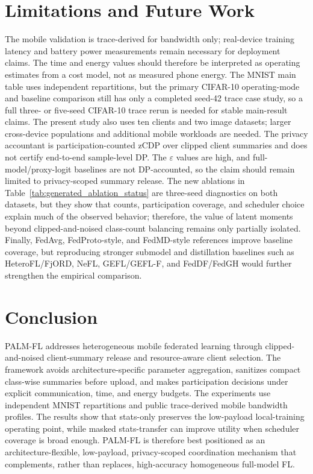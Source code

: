 \documentclass[10pt,journal]{IEEEtran}
\newcommand{\statsonly}{stats-only}
\newcommand{\statstransfer}{stats-transfer}
\begin{document}
\section{Limitations and Future Work}
The mobile validation is trace-derived for bandwidth only; real-device training latency and battery power measurements remain necessary for deployment claims. The time and energy values should therefore be interpreted as operating estimates from a cost model, not as measured phone energy. The MNIST main table uses independent repartitions, but the primary CIFAR-10 operating-mode and baseline comparison still has only a completed seed-42 trace case study, so a full three- or five-seed CIFAR-10 trace rerun is needed for stable main-result claims. The present study also uses ten clients and two image datasets; larger cross-device populations and additional mobile workloads are needed. The privacy accountant is participation-counted zCDP over clipped client summaries and does not certify end-to-end sample-level DP. The $\varepsilon$ values are high, and full-model/proxy-logit baselines are not DP-accounted, so the claim should remain limited to privacy-scoped summary release. The new ablations in Table~\ref{tab:generated_ablation_status} are three-seed diagnostics on both datasets, but they show that counts, participation coverage, and scheduler choice explain much of the observed behavior; therefore, the value of latent moments beyond clipped-and-noised class-count balancing remains only partially isolated. Finally, FedAvg, FedProto-style, and FedMD-style references improve baseline coverage, but reproducing stronger submodel and distillation baselines such as HeteroFL/FjORD, NeFL, GEFL/GEFL-F, and FedDF/FedGH would further strengthen the empirical comparison.

\section{Conclusion}
PALM-FL addresses heterogeneous mobile federated learning through clipped-and-noised client-summary release and resource-aware client selection. The framework avoids architecture-specific parameter aggregation, sanitizes compact class-wise summaries before upload, and makes participation decisions under explicit communication, time, and energy budgets. The experiments use independent MNIST repartitions and public trace-derived mobile bandwidth profiles. The results show that \statsonly{} preserves the low-payload local-training operating point, while masked \statstransfer{} can improve utility when scheduler coverage is broad enough. PALM-FL is therefore best positioned as an architecture-flexible, low-payload, privacy-scoped coordination mechanism that complements, rather than replaces, high-accuracy homogeneous full-model FL.
\end{document}
